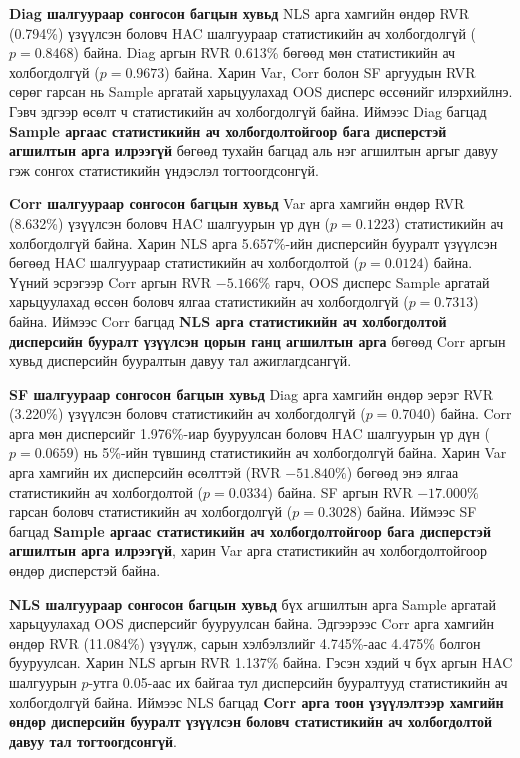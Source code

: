 \par\medskip
\noindent
\textbf{Diag шалгуураар сонгосон багцын хувьд}
NLS арга хамгийн өндөр RVR (0.794\%) үзүүлсэн
боловч HAC шалгуураар статистикийн ач холбогдолгүй
(\(p=0.8468\)) байна. Diag аргын RVR 0.613\% бөгөөд
мөн статистикийн ач холбогдолгүй (\(p=0.9673\)) байна.
Харин Var, Corr болон SF аргуудын RVR сөрөг гарсан
нь Sample аргатай харьцуулахад OOS дисперс өссөнийг
илэрхийлнэ. Гэвч эдгээр өсөлт ч статистикийн
ач холбогдолгүй байна.
Иймээс Diag багцад \textbf{Sample аргаас статистикийн
	ач холбогдолтойгоор бага дисперстэй агшилтын арга
	илрээгүй} бөгөөд тухайн багцад аль нэг агшилтын
аргыг давуу гэж сонгох статистикийн үндэслэл
тогтоогдсонгүй.

\par\medskip
\noindent
\textbf{Corr шалгуураар сонгосон багцын хувьд}
Var арга хамгийн өндөр RVR (8.632\%) үзүүлсэн
боловч HAC шалгуурын үр дүн (\(p=0.1223\))
статистикийн ач холбогдолгүй байна.
Харин NLS арга 5.657\%-ийн дисперсийн бууралт
үзүүлсэн бөгөөд HAC шалгуураар статистикийн
ач холбогдолтой (\(p=0.0124\)) байна.
Үүний эсрэгээр Corr аргын RVR $-5.166\%$ гарч,
OOS дисперс Sample аргатай харьцуулахад өссөн
боловч ялгаа статистикийн ач холбогдолгүй
(\(p=0.7313\)) байна.
Иймээс Corr багцад \textbf{NLS арга статистикийн
	ач холбогдолтой дисперсийн бууралт үзүүлсэн
	цорын ганц агшилтын арга} бөгөөд Corr аргын
хувьд дисперсийн бууралтын давуу тал
ажиглагдсангүй.

\par\medskip
\noindent
\textbf{SF шалгуураар сонгосон багцын хувьд}
Diag арга хамгийн өндөр эерэг RVR (3.220\%)
үзүүлсэн боловч статистикийн ач холбогдолгүй
(\(p=0.7040\)) байна.
Corr арга мөн дисперсийг 1.976\%-иар бууруулсан
боловч HAC шалгуурын үр дүн (\(p=0.0659\))
нь 5\%-ийн түвшинд статистикийн ач холбогдолгүй
байна.
Харин Var арга хамгийн их дисперсийн өсөлттэй
(RVR $-51.840\%$) бөгөөд энэ ялгаа статистикийн
ач холбогдолтой (\(p=0.0334\)) байна.
SF аргын RVR $-17.000\%$ гарсан боловч
статистикийн ач холбогдолгүй (\(p=0.3028\)) байна.
Иймээс SF багцад \textbf{Sample аргаас статистикийн
	ач холбогдолтойгоор бага дисперстэй агшилтын арга
	илрээгүй}, харин Var арга статистикийн
ач холбогдолтойгоор өндөр дисперстэй байна.

\par\medskip
\noindent
\textbf{NLS шалгуураар сонгосон багцын хувьд}
бүх агшилтын арга Sample аргатай харьцуулахад
OOS дисперсийг бууруулсан байна.
Эдгээрээс Corr арга хамгийн өндөр RVR (11.084\%)
үзүүлж, сарын хэлбэлзлийг 4.745\%-аас 4.475\%
болгон бууруулсан.
Харин NLS аргын RVR 1.137\% байна.
Гэсэн хэдий ч бүх аргын HAC шалгуурын
\(p\)-утга 0.05-аас их байгаа тул дисперсийн
бууралтууд статистикийн ач холбогдолгүй байна.
Иймээс NLS багцад \textbf{Corr арга тоон үзүүлэлтээр
	хамгийн өндөр дисперсийн бууралт үзүүлсэн боловч
	статистикийн ач холбогдолтой давуу тал
	тогтоогдсонгүй}.

